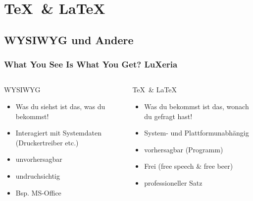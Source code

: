\section{\TeX~\& \LaTeX}
\begin{frame}
	\frametitle{}
	\tableofcontents[currentsection]
\end{frame}

\subsection{WYSIWYG und Andere}
\begin{frame}
	\frametitle{What You See Is What You Get? \hfill{} \footnotesize{LuXeria}}
	\begin{columns}
		\begin{column}{5cm}
			\begin{alertblock}{WYSIWYG}
				\begin{itemize}
					\item Was du siehst ist das, was du bekommst!
					\item Interagiert mit Systemdaten (Druckertreiber etc.)
					\item unvorhersagbar
					\item undruchsichtig
					\item Bsp. MS-Office
				\end{itemize}
			\end{alertblock}
		\end{column}
		\begin{column}{5cm}
			\begin{exampleblock}{\TeX~\& \LaTeX}
				\begin{itemize}
					\item Was du bekommst ist das, wonach du gefragt hast!
					\item System- und Plattformunabhängig
					\item vorhersagbar (Programm)
					\item Frei (free speech \& free beer)
					\item professioneller Satz
				\end{itemize}
			\end{exampleblock}
		\end{column}
	\end{columns}
\end{frame}

